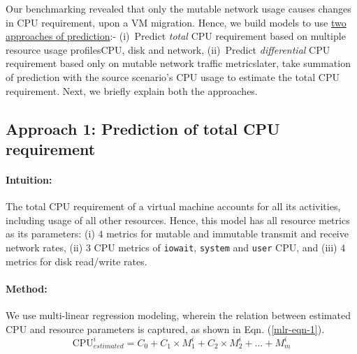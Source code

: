 Our benchmarking revealed that only the mutable network usage
causes changes in CPU requirement, upon a VM migration.
Hence, we build models to use \underline{two approaches of prediction}:-
(i)~Predict \textit{total} CPU requirement based on multiple 
resource usage profiles\textemdash{}CPU, disk and network,
(ii)~Predict \textit{differential} CPU requirement based only on
mutable network traffic metrics\textemdash{}later, take summation
of prediction with the source scenario's CPU usage to estimate
the total CPU requirement. Next, we briefly explain both the
approaches.

\subsection*{Approach 1: Prediction of total CPU requirement}

\paragraph{Intuition:} 
The total CPU requirement of a virtual machine accounts for all its 
activities, including usage of all other resources. Hence, this model
has all resource metrics as its
parameters: (i) $4$ metrics for mutable and
immutable transmit and receive network rates,
(ii) $3$ CPU metrics of \texttt{iowait}, \texttt{system}
and \texttt{user} CPU, and
(iii) $4$ metrics for disk read/write rates.

\vspace{-0.2in}
\paragraph{Method:} We use multi-linear regression modeling, wherein
the relation between estimated CPU and resource parameters is captured, 
as shown in Eqn. (\ref{mlr-eqn-1}).
\vspace{-0.2in}
\begin{equation}
\mbox{CPU}^{i}_{estimated} = C_{0} + C_{1} \times M^{i}_{1} + C_{2} \times M^{i}_{2} + ... + M^{i}_{m}
\label{mlr-eqn-1}
\end{equation}

